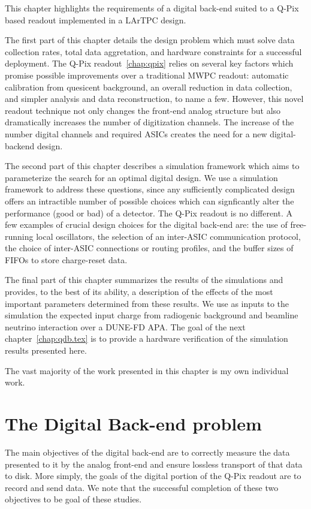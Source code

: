 This chapter highlights the requirements of a digital back-end suited to a Q-Pix based readout implemented in a LArTPC design.

The first part of this chapter details the design problem which must solve data collection rates, total data aggretation, and hardware constraints for a successful deployment.
The Q-Pix readout~\ref{chap:qpix} relies on several key factors which promise possible improvements over a traditional MWPC readout: automatic calibration from quesicent background, an overall reduction in data collection, and simpler analysis and data reconstruction, to name a few.
However, this novel readout technique not only changes the front-end analog structure but also dramatically increases the number of digitization channels.
The increase of the number digital channels and required ASICs creates the need for a new digital-backend design.

The second part of this chapter describes a simulation framework which aims to parameterize the search for an optimal digital design.
We use a simulation framework to address these questions, since any sufficiently complicated design offers an intractible number of possible choices which can signficantly alter the performance (good or bad) of a detector.
The Q-Pix readout is no different.
A few examples of crucial design choices for the digital back-end are: the use of free-running local oscillators, the selection of an inter-ASIC communication protocol, the choice of inter-ASIC connections or routing profiles, and the buffer sizes of FIFOs to store charge-reset data.

The final part of this chapter summarizes the results of the simulations and provides, to the best of its ability, a description of the effects of the most important parameters determined from these results.
We use as inputs to the simulation the expected input charge from radiogenic background and beamline neutrino interaction over a DUNE-FD APA.
The goal of the next chapter~\ref{chap:qdb.tex} is to provide a hardware verification of the simulation results presented here.

The vast majority of the work presented in this chapter is my own individual work.

\section{The Digital Back-end problem}

The main objectives of the digital back-end are to correctly measure the data presented to it by the analog front-end and ensure lossless transport of that data to disk.
More simply, the goals of the digital portion of the Q-Pix readout are to record and send data.
We note that the successful completion of these two objectives to be goal of these studies.

